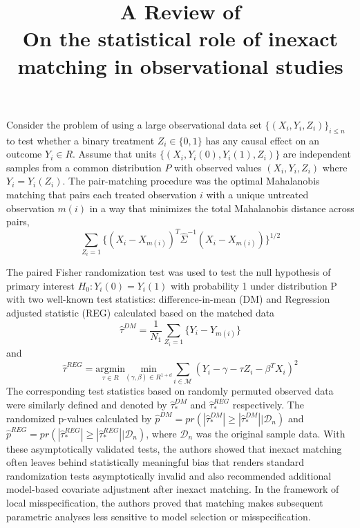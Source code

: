 \documentclass[11pt]{article}
\title{A Review of \\ On the statistical role of inexact matching in observational studies}
\begin{document}
	\maketitle	
Consider the problem of using a large observational data set $\{ (X_i, Y_i, Z_i) \}_{i \le n}$ to test whether a binary treatment $Z_i \in \{0, 1\}$ has any causal effect on an outcome $Y_i \in R$. Assume that units $\{ (X_i, Y_i(0), Y_i(1), Z_i) \}$ are independent samples from a common distribution $P$ with observed values $(X_i, Y_i, Z_i)$ where $Y_i = Y_i(Z_i)$. The pair-matching procedure was the optimal Mahalanobis matching that pairs each treated observation $i$ with a unique untreated observation $m(i)$ in a way that minimizes the total Mahalanobis distance across pairs,
$$
\sum_{Z_i=1}\{(X_i-X_{m(i)})^T\hat{\Sigma}^{-1}(X_i-X_{m(i)}) \}^{1/2}
$$

The paired Fisher randomization test was used to test the null hypothesis of primary interest $H_0: Y_i(0) = Y_i(1)$ with probability 1 under distribution P with two well-known test statistics: difference-in-mean (DM) and Regression adjusted statistic (REG) calculated based on the matched data
$$
\hat{\tau}^{DM} = \frac{1}{N_1}\sum_{Z_i=1}\{Y_i - Y_{m(i)}\}
$$ 
and
$$
\hat{\tau}^{REG} = \underset{\tau\in R}{\text{argmin}}\underset{(\gamma, \beta)\in R^{1+d}}{\text{min}} \sum_{i \in \mathcal{M}} (Y_i-\gamma-\tau Z_i-\beta^TX_i)^2
$$
The corresponding test statistics based on randomly permuted observed data were similarly defined and denoted by $\hat{\tau}_{*}^{DM}$ and $\hat{\tau}_{*}^{REG}$ respectively. The randomized p-values calculated by $\hat{p}^{DM} = pr(|\hat{\tau}_*^{DM}| \ge |\hat{\tau}_*^{DM}| | \mathcal{D}_n)$ and $\hat{p}^{REG} = pr(|\hat{\tau}_*^{REG}| \ge |\hat{\tau}_*^{REG}| | \mathcal{D}_n)$, where $\mathcal{D}_n$ was the original sample data. With these asymptotically validated tests, the authors showed that inexact matching often leaves behind statistically meaningful bias that renders standard randomization tests asymptotically invalid and also recommended additional model-based covariate adjustment after inexact matching.	In the framework of local misspecification, the authors proved that matching makes subsequent parametric analyses less sensitive to model selection or misspecification.
\end{document}
